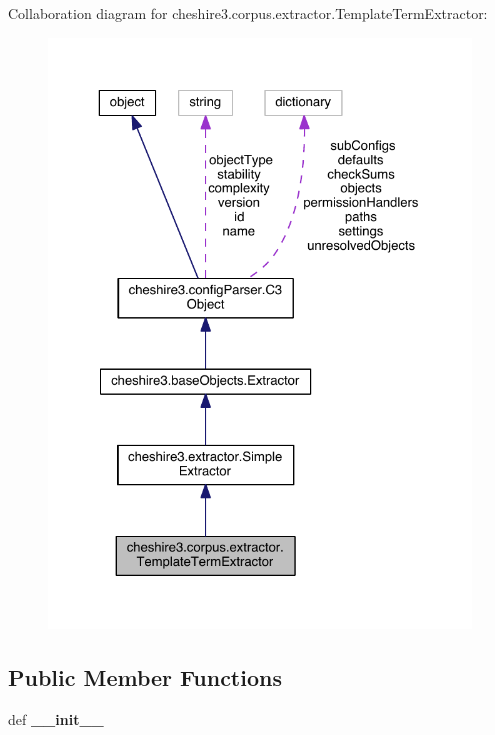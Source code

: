 Collaboration diagram for cheshire3.\-corpus.\-extractor.\-Template\-Term\-Extractor\-:
\nopagebreak
\begin{figure}[H]
\begin{center}
\leavevmode
\includegraphics[width=325pt]{classcheshire3_1_1corpus_1_1extractor_1_1_template_term_extractor__coll__graph}
\end{center}
\end{figure}
\subsection*{Public Member Functions}
\begin{DoxyCompactItemize}
\item 
\hypertarget{classcheshire3_1_1corpus_1_1extractor_1_1_template_term_extractor_aabc3c98af2814232f3d9b773ff78f902}{def {\bfseries \-\_\-\-\_\-init\-\_\-\-\_\-}}\label{classcheshire3_1_1corpus_1_1extractor_1_1_template_term_extractor_aabc3c98af2814232f3d9b773ff78f902}

\end{DoxyCompactItemize}
